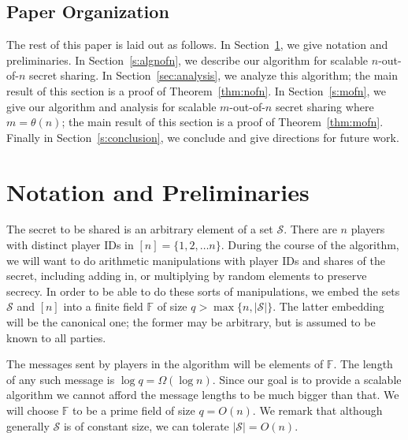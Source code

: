 \documentclass[12pt]{article}
\theoremstyle{definition}
\renewcommand{\S}{\mathcal{S}}
\newcommand{\F}{\mathbb{F}}
\begin{document}
\subsection{Paper Organization}

The rest of this paper is laid out as follows.  In
Section~\ref{sec:prelim}, we give notation and preliminaries.  In
Section~\ref{s:algnofn}, we describe our algorithm for scalable
$n$-out-of-$n$ secret sharing.  In Section~\ref{sec:analysis}, we
analyze this algorithm; the main result of this section is a proof of
Theorem~\ref{thm:nofn}.  In Section~\ref{s:mofn}, we give our
algorithm and analysis for scalable $m$-out-of-$n$ secret sharing
where $m = \theta(n)$; the main result of this section is a proof of 
Theorem~\ref{thm:mofn}.  Finally in Section~\ref{s:conclusion}, 
we conclude and give directions for future work.

\section{Notation and Preliminaries}\label{sec:prelim}

The secret to be shared is an arbitrary element of a set $\S$. 
There are $n$ players with distinct player IDs in $[n] = \{1, 2, \dots n\}$. 
During the course of the algorithm, we will want to do arithmetic 
manipulations with player IDs and shares of the secret, including adding 
in, or multiplying by random elements to preserve secrecy. In order to be 
able to do these sorts of manipulations, we embed the sets $\S$ 
and $[n]$ into a finite field $\F$ of size $q >\max\{n, |\S|\}$.
The latter embedding will be the canonical one; the former may be arbitrary, 
but is assumed to be known to all parties.

The messages sent by players in the algorithm will be elements of $\F$. 
The length of any such message is $\log q = \Omega(\log n)$. Since our 
goal is to provide a scalable algorithm we cannot afford the message 
lengths to be much bigger than that. We will choose $\F$ to be a prime field
of size $q=O(n)$. We remark that although generally 
$\S$ is of constant size, we can tolerate $|\S|=O(n)$.
\end{document}
